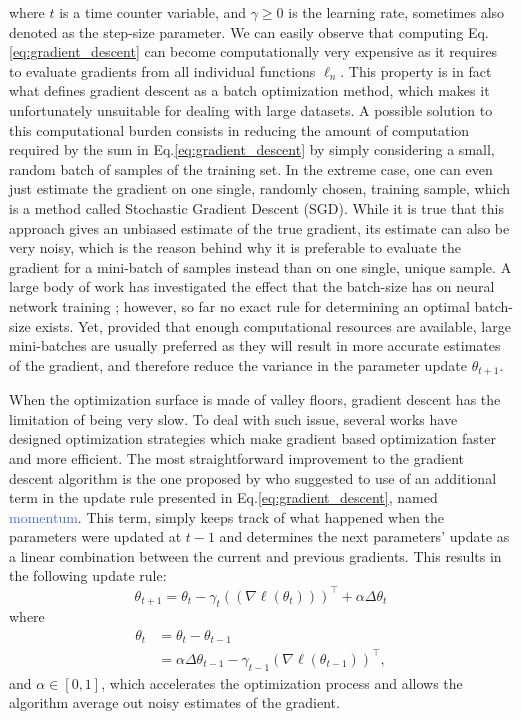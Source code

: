 where $t$ is a time counter variable, and $\gamma\geq0$ is the learning rate, sometimes also denoted as the step-size parameter. We can easily observe that computing Eq. \ref{eq:gradient_descent} can become computationally very expensive as it requires to evaluate gradients from all individual functions $\ell_n$. This property is in fact what defines gradient descent as a batch optimization method, which makes it unfortunately unsuitable for dealing with large datasets. A possible solution to this computational burden consists in reducing the amount of computation required by the sum in Eq.\ref{eq:gradient_descent} by simply considering a small, random batch of samples of the training set. In the extreme case, one can even just estimate the gradient on one single, randomly chosen, training sample, which is a method called Stochastic Gradient Descent (SGD). While it is true that this approach gives an unbiased estimate of the true gradient, its estimate can also be very noisy, which is the reason behind why it is preferable to evaluate the gradient for a mini-batch of samples instead than on one single, unique sample. A large body of work has investigated the effect that the batch-size has on neural network training \cite{keskar2016large,radiuk2017impact,kandel2020effect}; however, so far no exact rule for determining an optimal batch-size exists. Yet, provided that enough computational resources are available, large mini-batches are usually preferred as they will result in more accurate estimates of the gradient, and therefore reduce the variance in the parameter update $\theta_{t+1}$. 

When the optimization surface is made of valley floors, gradient descent has the limitation of being very slow. To deal with such issue, several works have designed optimization strategies which make gradient based optimization faster and more efficient. The most straightforward improvement to the gradient descent algorithm is the one proposed by \citet{rumelhart1986learning} who suggested to use of an additional term in the update rule presented in Eq.\ref{eq:gradient_descent}, named \textcolor{RoyalBlue}{momentum}. This term, simply keeps track of what happened when the parameters were updated at $t-1$ and determines the next parameters' update as a linear combination between the current and previous gradients. This results in the following update rule:
\begin{equation}
	\theta_{t+1} = \theta_t - \gamma_t ((\nabla \ell(\theta_t)))^{\intercal} + \alpha\Delta\theta_t
	\label{eq: momentum}
\end{equation}
where  
\begin{equation}
	\begin{split}
	\theta_{t} & = \theta_t - \theta_{t-1} \\ 
		   & = \alpha\Delta\theta_{t-1}-\gamma_{t-1}(\nabla \ell(\theta_{t-1}))^{\intercal},
	\end{split}
\label{eq:gradient_descent}
\end{equation}
and $\alpha\in[0,1]$, which accelerates the optimization process and allows the algorithm average out noisy estimates of the gradient.

